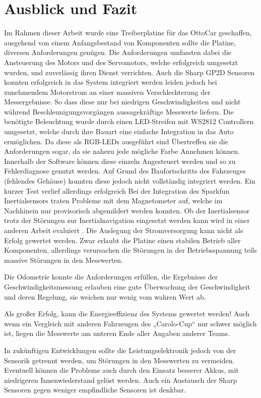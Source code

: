 \chapter{Ausblick und Fazit}

Im Rahmen dieser Arbeit wurde eine Treiberplatine für das OttoCar geschaffen, ausgehend von einem Anfangsbestand von Komponenten sollte die Platine, diversen Anforderungen genügen.
Die Anforderungen umfassten dabei die Ansteuerung des Motors und des Servomotors, welche erfolgreich umgesetzt wurden, und zuverlässig ihren Dienst verrichten.
Auch die Sharp GP2D Sensoren konnten erfolgreich in das System integriert werden leiden jedoch bei zunehmendem Motorstrom an einer massiven Verschlechterung der Messergebnisse.
So dass diese nur bei niedrigen Geschwindigkeiten und nicht während Beschleunigungsvorgängen aussagekräftige Messwerte liefern.
Die benötigte Beleuchtung wurde durch einen LED-Streifen mit WS2812 Controllern umgesetzt, welche durch ihre Bauart eine einfache Integration in das Auto ermöglichen.
Da diese als RGB-LEDs ausgeführt sind Übertreffen sie die Anforderungen sogar, da sie nahezu jede mögliche Farbe Annehmen können. Innerhalb der Software können diese einzeln Angesteuert
werden und so zu Fehlerdiagnose genutzt werden. Auf Grund des Baufortschritts des Fahrzeuges (fehlendes Gehäuse) konnten diese jedoch nicht vollständig integriert werden. Ein kurzer Test
verlief allerdings erfolgreich
Bei der Integration des Sparkfun Inertialsensors traten Probleme mit dem Magnetometer auf, welche im Nachhinein nur provisorisch abgemildert werden konnten.
Ob der Inertialsensor trotz der Störungen zur Inertialnavigation eingesetzt werden kann wird in einer anderen Arbeit evaluiert \cite{martins_arbeit}. 
Die Auslegung der Stromversorgung kann nicht als Erfolg gewertet werden. Zwar erlaubt die Platine einen stabilen Betrieb aller Komponenten, allerdings
verursachen die Störungen in der Betriebsspannung teils massive Störungen in den Messwerten. 

Die Odometrie konnte die Anforderungen erfüllen, die Ergebnisse der Geschwindigkeitsmessung erlauben eine gute Überwachung der Geschwindigkeit und deren Regelung, sie weichen nur wenig vom wahren Wert ab.

Als großer Erfolg, kann die Energieeffizienz des Systems gewertet werden! Auch wenn ein Vergleich mit anderen Fahrzeugen des „Carolo-Cup“ nur schwer möglich ist, liegen die Messwerte am unteren Ende aller Angaben anderer
Teams.

In zukünftigen Entwicklungen sollte die Leistungselektronik  jedoch von der Sensorik getrennt werden, um Störungen in den Messwerten zu vermeiden. Eventuell können die Probleme auch durch
den Einsatz besserer Akkus, mit niedrigeren Innenwiederstand gelöst werden. Auch ein Austausch der Sharp Sensoren gegen weniger empfindliche Sensoren ist denkbar. 

